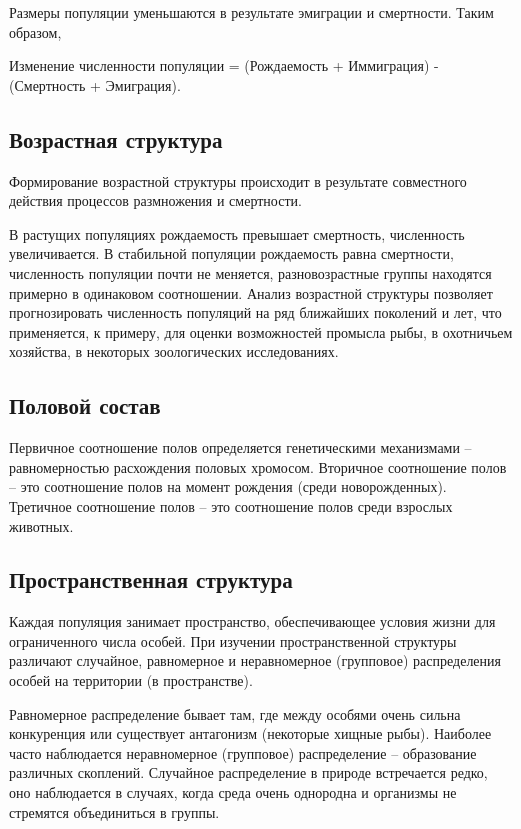 \documentclass[a5paper, 11pt]{extarticle}
\theoremstyle{definition}
\theoremstyle{definition}
\theoremstyle{definition}
\numberwithin{figure}{section}
\begin{document}
Размеры популяции уменьшаются в результате эмиграции и смертности. Таким образом,

Изменение численности популяции = (Рождаемость + Иммиграция) - (Смертность + Эмиграция).

\subsection{Возрастная структура}

Формирование возрастной структуры происходит в результате совместного действия процессов размножения и смертности.

В растущих популяциях рождаемость превышает смертность, численность увеличивается. В стабильной популяции рождаемость равна смертности, численность популяции почти не меняется, разновозрастные группы находятся примерно в одинаковом соотношении. Анализ возрастной структуры позволяет прогнозировать численность популяций на ряд ближайших поколений и лет, что применяется, к примеру, для оценки возможностей промысла рыбы, в охотничьем хозяйства, в некоторых зоологических исследованиях.

\subsection{Половой состав}

Первичное соотношение полов определяется генетическими механизмами -- равномерностью расхождения половых хромосом. Вторичное соотношение полов -- это соотношение полов на момент рождения (среди новорожденных). Третичное соотношение полов -- это соотношение полов среди взрослых животных.

\subsection{Пространственная структура}

Каждая популяция занимает пространство, обеспечивающее условия жизни для ограниченного числа особей. При изучении пространственной структуры различают случайное, равномерное и неравномерное (групповое) распределения особей на территории (в пространстве).

Равномерное распределение бывает там, где между особями очень сильна конкуренция или существует антагонизм (некоторые хищные рыбы). Наиболее часто наблюдается неравномерное (групповое) распределение -- образование различных скоплений. Случайное распределение в природе встречается редко, оно наблюдается в случаях, когда среда очень однородна и организмы не стремятся объединиться в группы.
\end{document}
